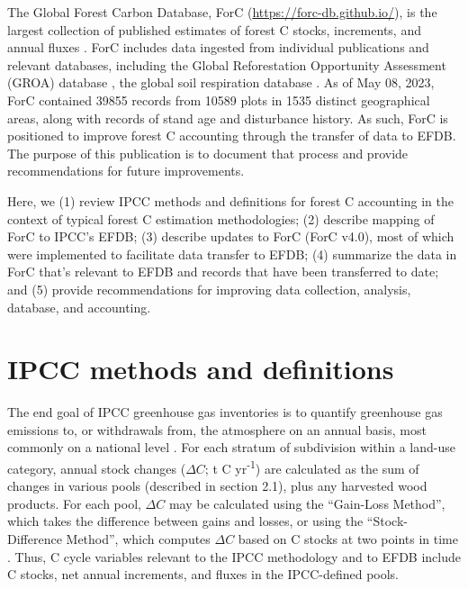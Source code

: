 \documentclass[, manuscript]{copernicus}
\begin{document}
The Global Forest Carbon Database, ForC
(\url{https://forc-db.github.io/}), is the largest collection of
published estimates of forest C stocks, increments, and annual fluxes
\citep{anderson-teixeira_forc_2018, anderson-teixeira_carbon_2021}. ForC
includes data ingested from individual publications and relevant
databases, including the Global Reforestation Opportunity Assessment
(GROA) database \citep[database doi:
10.5281/zenodo.3983644]{cook-patton_mapping_2020}, the global soil
respiration database
\citep[SRDB-V5,][]{bond-lamberty_global_2010, jian_restructured_2021}.
As of May 08, 2023, ForC contained 39855 records from 10589 plots in
1535 distinct geographical areas, along with records of stand age and
disturbance history. As such, ForC is positioned to improve forest C
accounting through the transfer of data to EFDB. The purpose of this
publication is to document that process and provide recommendations for
future improvements.

Here, we (1) review IPCC methods and definitions for forest C accounting
in the context of typical forest C estimation methodologies; (2)
describe mapping of ForC to IPCC's EFDB; (3) describe updates to ForC
(ForC v4.0), most of which were implemented to facilitate data transfer
to EFDB; (4) summarize the data in ForC that's relevant to EFDB and
records that have been transferred to date; and (5) provide
recommendations for improving data collection, analysis, database, and
accounting.

\section{IPCC methods and definitions}

The end goal of IPCC greenhouse gas inventories is to quantify
greenhouse gas emissions to, or withdrawals from, the atmosphere on an
annual basis, most commonly on a national level
\citep{ipcc_2006_2006, ipcc_2019_2019}. For each stratum of subdivision
within a land-use category, annual stock changes (\(\Delta C\); t C
yr\textsuperscript{-1}) are calculated as the sum of changes in various
pools (described in section 2.1), plus any harvested wood products. For
each pool, \(\Delta C\) may be calculated using the ``Gain-Loss
Method'', which takes the difference between gains and losses, or using
the ``Stock-Difference Method'', which computes \(\Delta C\) based on C
stocks at two points in time \citep{ipcc_2006_2006}. Thus, C cycle
variables relevant to the IPCC methodology and to EFDB include C stocks,
net annual increments, and fluxes in the IPCC-defined pools.
\end{document}
